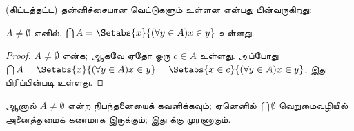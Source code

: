 \documentclass[../../../include/open-logic-section]{subfiles}
\begin{document}
(கிட்டத்தட்ட) தன்னிச்சையான வெட்டுகளும் உள்ளன என்பது பின்வருகிறது:

\begin{prop}
$A \neq \emptyset$ எனில்,
$\bigcap A = \Setabs{x}{(\forall y \in A)x \in y}$ உள்ளது.
\end{prop}

\begin{proof}
$A \neq \emptyset$ என்க; ஆகவே ஏதோ ஒரு $c \in A$ உள்ளது. அப்போது
$\bigcap A = \Setabs{x}{(\forall y \in A)x \in y} = \Setabs{x \in c}{(\forall y \in
A)x \in y}$; இது பிரிப்பின்படி உள்ளது.
\end{proof}

ஆனால் $A \neq \emptyset$ என்ற நிபந்தனையைக் கவனிக்கவும்; ஏனெனில்
$\bigcap \emptyset$ வெறுமைவழியில் அனைத்துமைக் கணமாக இருக்கும்; இது
 க்கு முரணாகும்.
\end{document}
